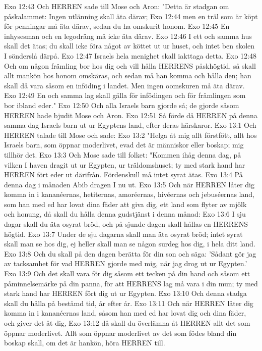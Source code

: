 Exo 12:43  Och HERREN sade till Mose och Aron: "Detta är stadgan om påskalammet: Ingen utlänning skall äta därav;
Exo 12:44  men en träl som är köpt för penningar må äta därav, sedan du ha omskurit honom.
Exo 12:45  En inhysesman och en legodräng må icke äta därav.
Exo 12:46  I ett och samma hus skall det ätas; du skall icke föra något av köttet ut ur huset, och intet ben skolen I sönderslå därpå.
Exo 12:47  Israels hela menighet skall iakttaga detta.
Exo 12:48  Och om någon främling bor hos dig och vill hålla HERRENS påskhögtid, så skall allt mankön hos honom omskäras, och sedan må han komma och hålla den; han skall då vara såsom en inföding i landet. Men ingen oomskuren må äta därav.
Exo 12:49  En och samma lag skall gälla för infödingen och för främlingen som bor ibland eder."
Exo 12:50  Och alla Israels barn gjorde så; de gjorde såsom HERREN hade bjudit Mose och Aron.
Exo 12:51  Så förde då HERREN på denna samma dag Israels barn ut ur Egyptens land, efter deras härskaror.
Exo 13:1  Och HERREN talade till Mose och sade:
Exo 13:2  "Helga åt mig allt förstfött, allt hos Israels barn, som öppnar moderlivet, evad det är människor eller boskap; mig tillhör det.
Exo 13:3  Och Mose sade till folket: "Kommen ihåg denna dag, på vilken I haven dragit ut ur Egypten, ur träldomshuset; ty med stark hand har HERREN fört eder ut därifrån. Fördenskull må intet syrat ätas.
Exo 13:4  På denna dag i månaden Abib dragen I nu ut.
Exo 13:5  Och när HERREN låter dig komma in i kananéernas, hetiternas, amoréernas, hivéernas och jebuséernas land, som han med ed har lovat dina fäder att giva dig, ett land som flyter av mjölk och honung, då skall du hålla denna gudstjänst i denna månad:
Exo 13:6  I sju dagar skall du äta osyrat bröd, och på sjunde dagen skall hållas en HERRENS högtid.
Exo 13:7  Under de sju dagarna skall man äta osyrat bröd; intet syrat skall man se hos dig, ej heller skall man se någon surdeg hos dig, i hela ditt land.
Exo 13:8  Och du skall på den dagen berätta för din son och säga: 'Sådant gör jag av tacksamhet för vad HERREN gjorde med mig, när jag drog ut ur Egypten.'
Exo 13:9  Och det skall vara för dig såsom ett tecken på din hand och såsom ett påminnelsemärke på din panna, för att HERRENS lag må vara i din mun; ty med stark hand har HERREN fört dig ut ur Egypten.
Exo 13:10  Och denna stadga skall du hålla på bestämd tid, år efter år.
Exo 13:11  Och när HERREN låter dig komma in i kananéernas land, såsom han med ed har lovat dig och dina fäder, och giver det åt dig,
Exo 13:12  då skall du överlämna åt HERREN allt det som öppnar moderlivet. Allt som öppnar moderlivet av det som födes bland din boskap skall, om det är hankön, höra HERREN till.
